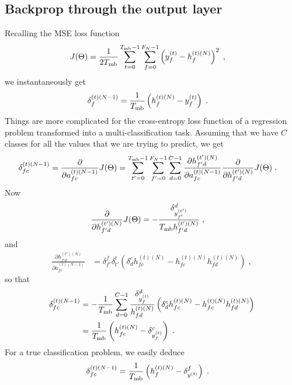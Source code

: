 \begin{subappendices}
\section{Backprop through the output layer} \label{sec:appenbpoutput}

Recalling the MSE loss function
\begin{align}
J(\Theta)&=\frac{1}{2T_{{\rm mb}}}\sum_{t=0}^{T_{{\rm mb}}-1}\sum_{f=0}^{F_N-1}
%
\left(y_f^{(t)}-h_{f}^{(t)(N)}\right)^2\;,
\end{align}
we instantaneously get
\begin{align}
\delta^{(t)(N-1)}_f&= \frac{1}{T_{{\rm mb}}}\left(h_{f}^{(t)(N)}-y_f^{(t)}\right)\;.
\end{align}
Things are more complicated for the cross-entropy loss function of a regression problem transformed into a multi-classification task.
Assuming that we have $C$ classes for all the values that we are trying to predict, we get
\begin{align}
\delta^{(t)(N-1)}_{fc}&= \frac{\partial }{\partial a_{fc}^{(t)(N-1)}}J(\Theta)
%
=\sum_{t'=0}^{T_{{\rm mb}}-1}\sum_{f'=0}^{F_N-1}\sum_{d=0}^{C-1}
%
\frac{\partial h_{f'd}^{(t')(N)}}{\partial a_{fc}^{(t)(N-1)}}
%
 \frac{\partial }{\partial h_{f'd}^{(t')(N)}}J(\Theta)\;.
\end{align}
Now
\begin{align}
 \frac{\partial }{\partial h_{f'd}^{(t')(N)}}J(\Theta)&=-\frac{\delta^{d}_{ y_{f'}^{(t')}}}{T_{{\rm mb}} h_{f'd}^{(t')(N)}}\;,
\end{align}
and
\begin{align}
\frac{\partial h_{f'd}^{(t')(N)}}{\partial a_{fc}^{(t)(N-1)}}&=
%
\delta^f_{f'}\delta^{t}_{t'} \left(\delta^c_d h_{fc}^{(t)(N)}- h_{fc}^{(t)(N)} h_{fd}^{(t)(N)}\right)\;,
\end{align}
so that
\begin{align}
\delta^{(t)(N-1)}_{fc}&=-\frac{1}{T_{{\rm mb}}} \sum_{d=0}^{C-1}\frac{\delta^{d}_{ y_f^{(t)}}}{h_{fd}^{(t)(N)}}
%
\left(\delta^c_d h_{fc}^{(t)(N)}- h_{fc}^{(t)(N)} h_{fd}^{(t)(N)}\right)\notag\\
%
&=\frac{1}{T_{{\rm mb}}}\left( h_{fc}^{(t)(N)}-\delta^{c}_{ y_f^{(t)}}\right)\;.
\end{align}
For a true classification problem, we easily deduce
\begin{align}
\delta^{(t)(N-1)}_{fc}&=\frac{1}{T_{{\rm mb}}}\left( h_{f}^{(t)(N)}-\delta^{f}_{ y^{(t)}}\right)\;.
\end{align}


\end{subappendices}
